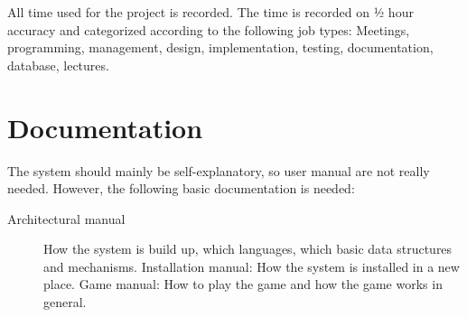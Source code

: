 \documentclass[12pt,a4paper]{article}
\begin{document}
All time used for the project is recorded.  The time is recorded on ½
hour accuracy and categorized according to the following job types:
Meetings, programming, management, design, implementation, testing,
documentation, database, lectures.

\section{Documentation}

The system should mainly be self-explanatory, so user manual are not
really needed. However, the following basic documentation is needed:

\begin{description}
\item[Architectural manual] How the system is build up, which languages,
which basic data structures and mechanisms.  Installation manual: How
the system is installed in a new place.  Game manual: How to play the
game and how the game works in general.
\end{description}
\end{document}
